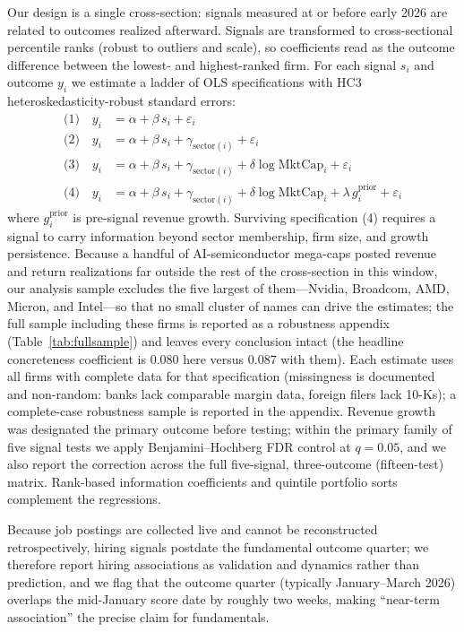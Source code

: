 \documentclass[11pt]{article}
\newcommand{\coef}[1]{\ensuremath{#1}}
\begin{document}
Our design is a single cross-section: signals measured at or before early 2026
are related to outcomes realized afterward. Signals are transformed to
cross-sectional percentile ranks (robust to outliers and scale), so
coefficients read as the outcome difference between the lowest- and
highest-ranked firm. For each signal $s_i$ and outcome $y_i$ we estimate a
ladder of OLS specifications with HC3 heteroskedasticity-robust standard
errors:
\begin{align*}
\text{(1)}\quad y_i &= \alpha + \beta\, s_i + \varepsilon_i\\
\text{(2)}\quad y_i &= \alpha + \beta\, s_i + \gamma_{\text{sector}(i)} + \varepsilon_i\\
\text{(3)}\quad y_i &= \alpha + \beta\, s_i + \gamma_{\text{sector}(i)} + \delta \log \text{MktCap}_i + \varepsilon_i\\
\text{(4)}\quad y_i &= \alpha + \beta\, s_i + \gamma_{\text{sector}(i)} + \delta \log \text{MktCap}_i + \lambda\, g^{\text{prior}}_i + \varepsilon_i
\end{align*}
where $g^{\text{prior}}_i$ is pre-signal revenue growth. Surviving
specification (4) requires a signal to carry information beyond sector
membership, firm size, and growth persistence. Because a handful of
AI-semiconductor mega-caps posted revenue and return realizations far outside
the rest of the cross-section in this window, our analysis sample excludes the
five largest of them---Nvidia, Broadcom, AMD, Micron, and Intel---so that no
small cluster of names can drive the estimates; the full sample including these
firms is reported as a robustness appendix (Table~\ref{tab:fullsample}) and
leaves every conclusion intact (the headline concreteness coefficient is
\coef{0.080} here versus \coef{0.087} with them). Each estimate uses all firms
with complete data for that specification (missingness is documented and
non-random: banks lack comparable margin data, foreign filers lack 10-Ks); a
complete-case robustness sample is reported in the appendix. Revenue growth was
designated the primary outcome before testing; within the primary family of
five signal tests we apply Benjamini--Hochberg FDR control at $q=0.05$, and we
also report the correction across the full five-signal, three-outcome
(fifteen-test) matrix.
Rank-based information coefficients and quintile portfolio sorts complement the
regressions.

Because job postings are collected live and cannot be reconstructed
retrospectively, hiring signals postdate the fundamental outcome quarter; we
therefore report hiring associations as validation and dynamics rather than
prediction, and we flag that the outcome quarter (typically January--March
2026) overlaps the mid-January score date by roughly two weeks, making
``near-term association'' the precise claim for fundamentals.
\end{document}
